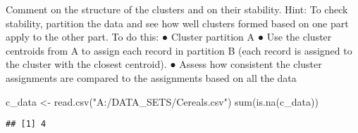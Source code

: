 \documentclass[
]{article}
\newenvironment{Shaded}{\begin{snugshade}}{\end{snugshade}}
\newcommand{\AttributeTok}[1]{\textcolor[rgb]{0.77,0.63,0.00}{#1}}
\newcommand{\CommentTok}[1]{\textcolor[rgb]{0.56,0.35,0.01}{\textit{#1}}}
\newcommand{\ControlFlowTok}[1]{\textcolor[rgb]{0.13,0.29,0.53}{\textbf{#1}}}
\newcommand{\DecValTok}[1]{\textcolor[rgb]{0.00,0.00,0.81}{#1}}
\newcommand{\FunctionTok}[1]{\textcolor[rgb]{0.00,0.00,0.00}{#1}}
\newcommand{\NormalTok}[1]{#1}
\newcommand{\OtherTok}[1]{\textcolor[rgb]{0.56,0.35,0.01}{#1}}
\newcommand{\SpecialCharTok}[1]{\textcolor[rgb]{0.00,0.00,0.00}{#1}}
\newcommand{\StringTok}[1]{\textcolor[rgb]{0.31,0.60,0.02}{#1}}
\begin{document}
Comment on the structure of the clusters and on their stability. Hint:
To check stability, partition the data and see how well clusters formed
based on one part apply to the other part. To do this: ● Cluster
partition A ● Use the cluster centroids from A to assign each record in
partition B (each record is assigned to the cluster with the closest
centroid). ● Assess how consistent the cluster assignments are compared
to the assignments based on all the data

\begin{Shaded}
\begin{Highlighting}[]
\NormalTok{c\_data }\OtherTok{\textless{}{-}} \FunctionTok{read.csv}\NormalTok{(}\StringTok{"A:/DATA\_SETS/Cereals.csv"}\NormalTok{)}
\FunctionTok{sum}\NormalTok{(}\FunctionTok{is.na}\NormalTok{(c\_data))}
\end{Highlighting}
\end{Shaded}

\begin{verbatim}
## [1] 4
\end{verbatim}

\begin{Shaded}
\end{Shaded}
\end{document}
